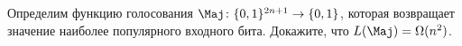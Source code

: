 Определим функцию голосования $\Maj\colon \{0, 1\}^{2n + 1} \to \{0, 1\}$, которая возвращает значение
наиболее популярного входного бита. Докажите, что $L(\Maj) = \Omega(n^2)$.
    
